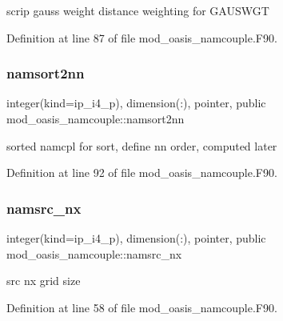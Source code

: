 scrip gauss weight distance weighting for G\+A\+U\+S\+W\+GT 



Definition at line 87 of file mod\+\_\+oasis\+\_\+namcouple.\+F90.

\mbox{\label{namespacemod__oasis__namcouple_a4555b14f38928b7f0fb7f77b9c42d0a0}} 
\subsubsection{\texorpdfstring{namsort2nn}{namsort2nn}}
{\footnotesize\ttfamily integer(kind=ip\+\_\+i4\+\_\+p), dimension(\+:), pointer, public mod\+\_\+oasis\+\_\+namcouple\+::namsort2nn}



sorted namcpl for sort, define nn order, computed later 



Definition at line 92 of file mod\+\_\+oasis\+\_\+namcouple.\+F90.

\mbox{\label{namespacemod__oasis__namcouple_ac8f6c8fe3720739f3d26431a8a600506}} 
\subsubsection{\texorpdfstring{namsrc\+\_\+nx}{namsrc\_nx}}
{\footnotesize\ttfamily integer(kind=ip\+\_\+i4\+\_\+p), dimension(\+:), pointer, public mod\+\_\+oasis\+\_\+namcouple\+::namsrc\+\_\+nx}



src nx grid size 



Definition at line 58 of file mod\+\_\+oasis\+\_\+namcouple.\+F90.

\mbox{\label{namespacemod__oasis__namcouple_ab82c80f007b37865172ddb033a1abb36}} 
